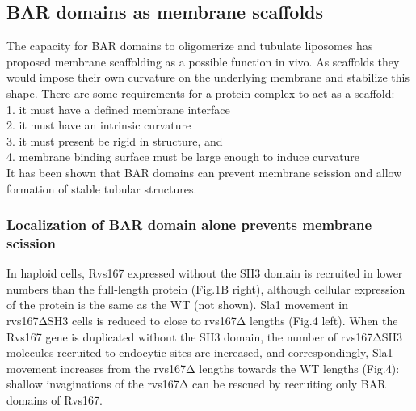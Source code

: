 	
	\subsection{BAR domains as membrane scaffolds}
	The capacity for BAR domains to oligomerize and tubulate liposomes has proposed membrane scaffolding as a possible function in vivo. As scaffolds they would impose their own curvature on the underlying membrane and stabilize this shape. There are some requirements for a protein complex to act as a scaffold:\\
	1. it must have a defined membrane interface\\
	2. it must have an intrinsic curvature\\
	3. it must present be rigid in structure, and\\
	4. membrane binding surface must be large enough to induce curvature\\
	
	
	 It has been shown that BAR domains can prevent membrane scission and allow formation of stable tubular structures. 
	
		\subsubsection{Localization of BAR domain alone prevents membrane scission}
		 In haploid cells, Rvs167 expressed without the SH3 domain is recruited in lower numbers than the full-length protein (Fig.1B right), although cellular expression of the protein is the same as the WT (not shown). Sla1 movement in rvs167ΔSH3 cells is reduced to close to rvs167Δ lengths (Fig.4 left). When the Rvs167 gene is duplicated without the SH3 domain, the number of rvs167ΔSH3 molecules recruited to endocytic sites are increased, and correspondingly, Sla1 movement increases from the rvs167Δ lengths towards the WT lengths (Fig.4): shallow invaginations of the rvs167Δ can be rescued by recruiting only BAR domains of Rvs167.
		 
